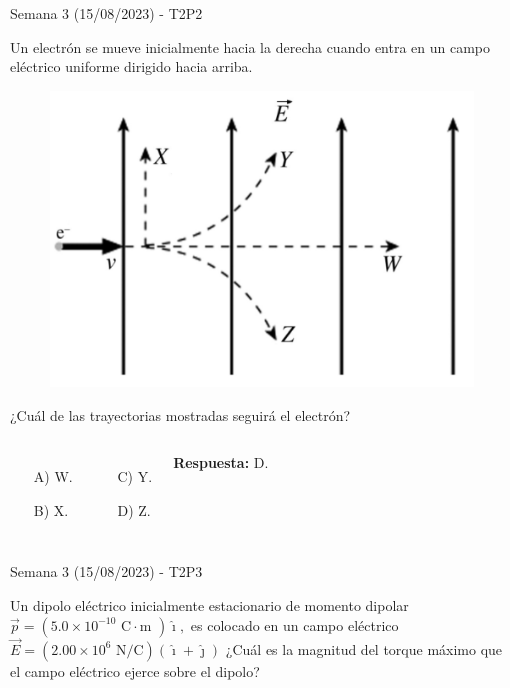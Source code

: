 \begin{frame}{Semana 3 (15/08/2023) - T2P2}

    Un electrón se mueve inicialmente hacia la derecha cuando entra en un campo eléctrico uniforme dirigido hacia arriba.
    
    \begin{figure}
        \centering
        \includegraphics[scale=0.3]{figures/t2p2.png}
    \end{figure}
    
    ¿Cuál de las trayectorias mostradas seguirá el electrón?
    
    \begin{columns}
    
    \begin{itemize}
        \item[A)] W.
        \item[B)] X.
    \end{itemize}
    
    
    \begin{itemize}
        \item[C)] Y.
        \item[D)] Z.
    \end{itemize}
    
    \pause\centering\textbf{Respuesta:} D.
    \end{columns}
    
\end{frame}

\begin{frame}{Semana 3 (15/08/2023) - T2P3}

    Un dipolo eléctrico inicialmente estacionario de momento dipolar $\Vec{p}=\left(5.0\times10^{-10}\text{ C}\cdot\text{m }\right)\hat{\imath},$ es colocado en un campo eléctrico $\vec{E}=\left( 2.00\times10^6\text{ N/C} \right)\left(\hat{\imath}+\hat{\jmath}\right)$ ¿Cuál es la magnitud del torque máximo que el campo eléctrico ejerce sobre el dipolo?
    
\end{frame}

